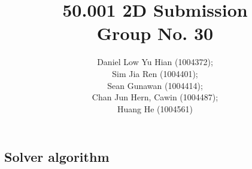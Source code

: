 \documentclass[a4paper,12pt]{article}
\begin{document}
\title{\Large{\textbf{50.001 2D Submission \\ Group No. 30 }}}
\author{Daniel Low Yu Hian (1004372); \\ 
Sim Jia Ren (1004401); \\ 
Sean Gunawan (1004414); \\ 
Chan Jun Hern, Cawin (1004487); \\ 
Huang He (1004561)}

\maketitle

\begin{multicols}{2}

\subsection*{Solver algorithm}


\end{multicols}
\end{document}
